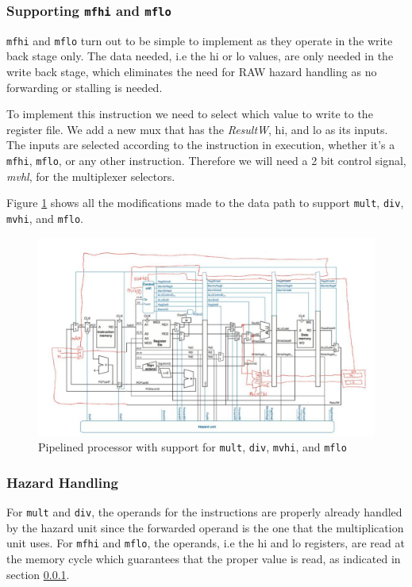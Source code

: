 \documentclass[titlepage,12pt,oneside,a4paper]{article}
\newcommand{\code}[1]{{\texttt{#1}}}
\begin{document}
\subsubsection{Supporting \code{mfhi} and \code{mflo}}
\label{mfhl}
\code{mfhi} and \code{mflo} turn out to be simple to implement as they operate in the write back stage only. The data needed, i.e the hi or lo values, are only needed in the write back stage, which eliminates the need for RAW hazard handling as no forwarding or stalling is needed.

To implement this instruction we need to select which value to write to the register file. We add a new mux that has the \textit{ResultW}, hi, and lo as its inputs. The inputs are selected according to the instruction in execution, whether it's a \code{mfhi}, \code{mflo}, or any other instruction. Therefore we will need a 2 bit control signal, \textit{mvhl}, for the multiplexer selectors.

Figure \ref{fig:mdhl} shows all the modifications made to the data path to support \code{mult}, \code{div}, \code{mvhi}, and \code{mflo}.

\begin{figure}
	\includegraphics[width=\textwidth]{mdhl.jpeg}
	\centering
	\caption{Pipelined processor with support for \code{mult}, \code{div}, \code{mvhi}, and \code{mflo}}
	\label{fig:mdhl}
\end{figure}

\subsubsection{Hazard Handling}
For \code{mult} and \code{div}, the operands for the instructions are properly already handled by the hazard unit since the forwarded operand is the one that the multiplication unit uses. For \code{mfhi} and \code{mflo}, the operands, i.e the hi and lo registers, are read at the memory cycle which guarantees that the proper value is read, as indicated in section \ref{mfhl}.
\end{document}
